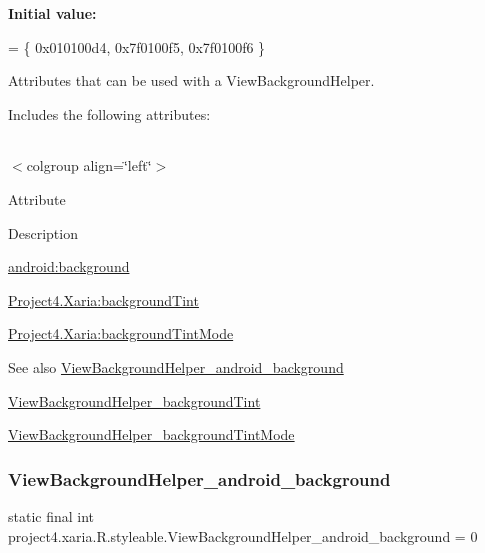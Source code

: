 {\bfseries Initial value\+:}
\begin{DoxyCode}
= \{
            0x010100d4, 0x7f0100f5, 0x7f0100f6
        \}
\end{DoxyCode}
Attributes that can be used with a View\+Background\+Helper. 

Includes the following attributes\+:

\tabulinesep=1mm
\begin{longtabu} spread 0pt [c]{*{0}{|X[-1]}|}
\hline
\end{longtabu}
$<$colgroup align=\char`\"{}left\char`\"{}$>$ 

Attribute

Description 

{\ttfamily \hyperlink{classproject4_1_1xaria_1_1R_1_1styleable_a0efbf4a37a0cec8003711cb6b2677f7c}{android\+:background}}

{\ttfamily \hyperlink{classproject4_1_1xaria_1_1R_1_1styleable_a27fac5a6cd4f1ec3ff5974130ad03ae1}{Project4.\+Xaria\+:background\+Tint}}

{\ttfamily \hyperlink{classproject4_1_1xaria_1_1R_1_1styleable_a3f5b3d3cb488c190a6f2a6481b79de1d}{Project4.\+Xaria\+:background\+Tint\+Mode}}

\begin{DoxySeeAlso}{See also}
\hyperlink{classproject4_1_1xaria_1_1R_1_1styleable_a0efbf4a37a0cec8003711cb6b2677f7c}{View\+Background\+Helper\+\_\+android\+\_\+background} 

\hyperlink{classproject4_1_1xaria_1_1R_1_1styleable_a27fac5a6cd4f1ec3ff5974130ad03ae1}{View\+Background\+Helper\+\_\+background\+Tint} 

\hyperlink{classproject4_1_1xaria_1_1R_1_1styleable_a3f5b3d3cb488c190a6f2a6481b79de1d}{View\+Background\+Helper\+\_\+background\+Tint\+Mode} 
\end{DoxySeeAlso}
\mbox{\label{classproject4_1_1xaria_1_1R_1_1styleable_a0efbf4a37a0cec8003711cb6b2677f7c}} 
\subsubsection{\texorpdfstring{View\+Background\+Helper\+\_\+android\+\_\+background}{ViewBackgroundHelper\_android\_background}}
{\footnotesize\ttfamily static final int project4.\+xaria.\+R.\+styleable.\+View\+Background\+Helper\+\_\+android\+\_\+background = 0\hspace{0.3cm}{\ttfamily [static]}}

